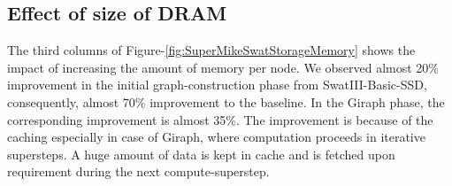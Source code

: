 \documentclass[conference]{IEEEtran}
\begin{document}



\subsection {Effect of size of DRAM} \label{EffectOfDRAM}
The third columns of Figure-\ref{fig:SuperMikeSwatStorageMemory} shows the impact of increasing the amount of memory per node. 
We observed almost 20\% improvement in the initial graph-construction phase from SwatIII-Basic-SSD, consequently, almost 70\% improvement to the baseline. %
In the Giraph phase, the corresponding improvement is almost 35\%. 
The improvement is because of the caching especially in case of Giraph, where computation proceeds in iterative supersteps. A huge amount of data is kept in cache and is fetched upon requirement during the next compute-superstep.
\end{document}
